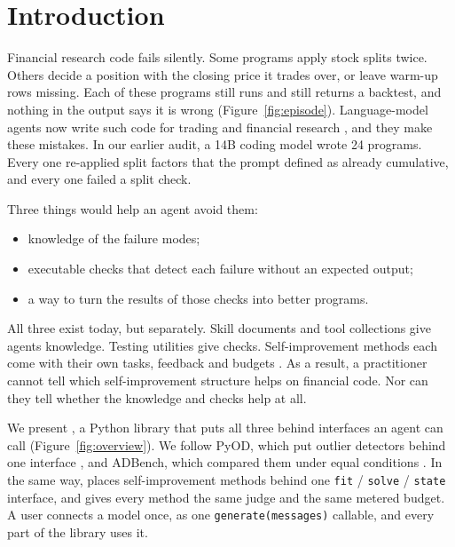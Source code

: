 \section{Introduction}
\label{sec:intro}

Financial research code fails silently. Some programs apply stock splits twice. Others
decide a position with the closing price it trades over, or leave warm-up rows missing.
Each of these programs still runs and still returns a backtest, and nothing in the output
says it is wrong (Figure~\ref{fig:episode}). Language-model agents now write such code for trading and financial
research \citep{zhang2024finagent,bigeard2025finance}, and they make these mistakes. In
our earlier audit, a 14B coding model wrote 24 programs. Every one re-applied split factors
that the prompt defined as already cumulative, and every one failed a split check.

Three things would help an agent avoid them:
\begin{itemize}
\item knowledge of the failure modes;
\item executable checks that detect each failure without an expected output;
\item a way to turn the results of those checks into better programs.
\end{itemize}
All three exist today, but separately. Skill documents and tool collections give agents
knowledge. Testing utilities give checks. Self-improvement methods each come with their own
tasks, feedback and budgets
\citep{shinn2023reflexion,chen2024selfdebug,zhao2024expel,agrawal2026gepa}. As a result,
a practitioner cannot tell which self-improvement structure helps on financial code. Nor
can they tell whether the knowledge and checks help at all.

We present \lib{}, a Python library that puts all three behind interfaces an agent can call
(Figure~\ref{fig:overview}). We follow PyOD, which put outlier detectors behind one
interface \citep{zhao2019pyod}, and ADBench, which compared them under equal conditions
\citep{han2022adbench}. In the same way, \lib{} places self-improvement methods behind one
\texttt{fit} / \texttt{solve} / \texttt{state} interface, and gives every method the same
judge and the same metered budget. A user connects a model once, as one
\texttt{generate(messages)} callable, and every part of the library uses it.

